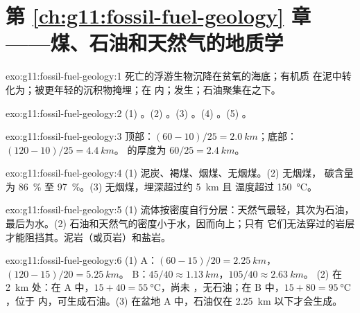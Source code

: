 \section*{第 \ref{ch:g11:fossil-fuel-geology} 章——煤、石油和天然气的地质学}

\begin{solution}{exo:g11:fossil-fuel-geology:1}
死亡的浮游生物沉降在贫氧的海底；有机质
在泥中转化为；被更年轻的沉积物掩埋；在
内；发生；石油聚集在之下。
\end{solution}

\begin{solution}{exo:g11:fossil-fuel-geology:2}
(1) 。(2) 。(3) 。(4) 。(5) 。
\end{solution}

\begin{solution}{exo:g11:fossil-fuel-geology:3}
顶部：$(60 - 10)/25 = \qty{2.0}{km}$；底部：$(120 - 10)/25 = \qty{4.4}{km}$。
的厚度为 $60/25 = \qty{2.4}{km}$。
\end{solution}

\begin{solution}{exo:g11:fossil-fuel-geology:4}
(1) 泥炭、褐煤、烟煤、无烟煤。(2) 无烟煤，
碳含量为 \qty{86}{\percent} 至 \qty{97}{\percent}。(3) 无烟煤，埋深超过约 \qty{5}{km} 且
温度超过 \qty{150}{\degreeCelsius}。
\end{solution}

\begin{solution}{exo:g11:fossil-fuel-geology:5}
(1) 流体按密度自行分层：天然气最轻，其次为石油，
最后为水。(2) 石油和天然气的密度小于水，因而向上；只有
它们无法穿过的岩层才能阻挡其。泥岩（或页岩）和盐岩。
\end{solution}

\begin{solution}{exo:g11:fossil-fuel-geology:6}
(1) A：$(60 - 15)/20 = \qty{2.25}{km}$，$(120 - 15)/20 = \qty{5.25}{km}$。
B：$45/40 \approx \qty{1.13}{km}$，$105/40 \approx \qty{2.63}{km}$。
(2) 在 \qty{2}{km} 处：在 A 中，$15 + 40 = \qty{55}{\degreeCelsius}$，尚未
，无石油；在 B 中，$15 + 80 = \qty{95}{\degreeCelsius}$，位于
内，可生成石油。(3) 在盆地 A 中，石油仅在
\qty{2.25}{km} 以下才会生成。
\end{solution}


